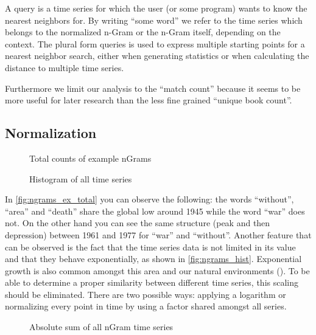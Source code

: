 \begin{definition}[Query]
    A query is a time series for which the user (or some program) wants to know the nearest neighbors for. By writing \enquote{some word} we refer to the time series which belongs to the normalized n-Gram or the n-Gram itself, depending on the context. The plural form queries is used to express multiple starting points for a nearest neighbor search, either when generating statistics or when calculating the distance to multiple time series.
\end{definition}

Furthermore we limit our analysis to the \enquote{match count} because it seems to be more useful for later research than the less fine grained \enquote{unique book count}.


\subsection{Normalization}
\label{ssec:baseline:sim:norm}

\begin{figure}
    \centering
    
    \caption{Total counts of example nGrams}\label{fig:ngrams_ex_total}
\end{figure}

\begin{figure}
    \centering
    
    \caption{Histogram of all time series}\label{fig:ngrams_hist}
\end{figure}

In \autoref{fig:ngrams_ex_total} you can observe the following: the words \enquote{without}, \enquote{area} and \enquote{death} share the global low around 1945 while the word \enquote{war} does not. On the other hand you can see the same structure (peak and then depression) between 1961 and 1977 for \enquote{war} and \enquote{without}. Another feature that can be observed is the fact that the time series data is not limited in its value and that they behave exponentially, as shown in \autoref{fig:ngrams_hist}. Exponential growth is also common amongst this area and our natural environments (\cite{exp_growth1,exp_growth2}). To be able to determine a proper similarity between different time series, this scaling should be eliminated. There are two possible ways: applying a logarithm or normalizing every point in time by using a factor shared amongst all series.

\begin{figure}
    \centering
    
    \caption{Absolute sum of all nGram time series}\label{fig:ngrams_sums}
\end{figure}

